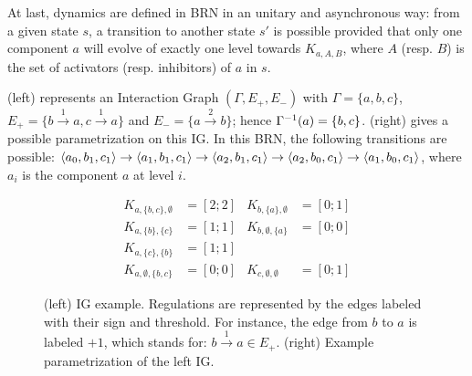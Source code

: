 At last, dynamics are defined in BRN in an unitary and asynchronous way:
from a given state $s$, a transition to another state $s'$ is possible provided that only one component $a$ will evolve of exactly one level towards $K_{a,A,B}$, where $A$ (resp. $B$) is the set of activators (resp. inhibitors) of $a$ in $s$.

\begin{example*}
(left) represents an Interaction Graph $(\Gamma,E_+,E_-)$ with
$\Gamma = \{a, b, c\}$,
$E_+ = \{b \xrightarrow{1} a, c \xrightarrow{1} a\}$ and
$E_- = \{a \xrightarrow{2} b\}$;
hence $\Gamma^{-1}(a) = \{b, c\}$.
(right) gives a possible parametrization on this IG.
In this BRN, the following transitions are possible:
$\mbox{$\langle a_0, b_1, c_1 \rangle$} \rightarrow \mbox{$\langle a_1, b_1, c_1 \rangle$} \rightarrow \mbox{$\langle a_2, b_1, c_1 \rangle$} \rightarrow
\mbox{$\langle a_2, b_0, c_1 \rangle$} \rightarrow \mbox{$\langle a_1, b_0, c_1 \rangle$}$,
where $a_i$ is the component $a$ at level $i$.
\end{example*}

\begin{figure}[h]
\begin{minipage}{0.4\linewidth}
\centering
{}
\end{minipage}
\begin{minipage}{0.6\linewidth}
\centering
\begin{align*}
K_{a,\{b,c\},\emptyset} &= [2 ; 2] & K_{b,\{a\},\emptyset} &= [0 ; 1] \\
K_{a,\{b\},\{c\}} &= [1 ; 1] & K_{b,\emptyset,\{a\}} &= [0 ; 0] \\
K_{a,\{c\},\{b\}} &= [1 ; 1] &&\\
K_{a,\emptyset,\{b,c\}} &= [0 ; 0] & K_{c,\emptyset,\emptyset} &= [0 ; 1]
\end{align*}
\end{minipage}
\caption{\label{fig:runningBRN}
(left)
IG example.
Regulations are represented by the edges labeled with their sign and threshold.
For instance, the edge from $b$ to $a$ is labeled $+1$, which stands for: $b \xrightarrow{1} a \in
E_+$.
(right)
Example parametrization of the left IG.
}
\end{figure}

